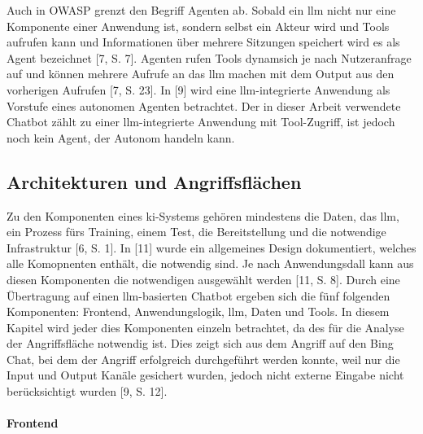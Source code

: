 Auch in OWASP grenzt den Begriff Agenten ab. Sobald ein \ac{llm} nicht nur eine Komponente einer Anwendung ist, sondern selbst ein Akteur wird und Tools aufrufen kann
und Informationen über mehrere Sitzungen speichert wird es als Agent bezeichnet [7, S. 7]. Agenten rufen Tools dynamsich je nach Nutzeranfrage auf und können 
mehrere Aufrufe an das \ac{llm} machen mit dem Output aus den vorherigen Aufrufen [7, S. 23]. In [9] wird eine \ac{llm}-integrierte Anwendung als Vorstufe eines 
autonomen Agenten betrachtet. Der in dieser Arbeit verwendete Chatbot zählt zu einer \ac{llm}-integrierte Anwendung mit Tool-Zugriff, ist jedoch noch kein 
Agent, der Autonom handeln kann. \\

\subsection{Architekturen und Angriffsflächen}

Zu den Komponenten eines \ac{ki}-Systems gehören mindestens die Daten, das \ac{llm}, ein Prozess fürs Training, einem Test, die Bereitstellung und die notwendige 
Infrastruktur [6, S. 1]. In [11] wurde ein allgemeines Design dokumentiert, welches alle Komopnenten enthält, die notwendig sind. Je nach Anwendungsdall kann 
aus diesen Komponenten die notwendigen ausgewählt werden [11, S. 8]. Durch eine Übertragung auf einen \ac{llm}-basierten Chatbot ergeben sich die fünf folgenden 
Komponenten: Frontend, Anwendungslogik, \ac{llm}, Daten und Tools. In diesem Kapitel wird jeder dies Komponenten einzeln betrachtet, da des für die Analyse
der Angriffsfläche notwendig ist. Dies zeigt sich aus dem Angriff auf den Bing Chat, bei dem der Angriff erfolgreich durchgeführt werden konnte, weil nur die 
Input und Output Kanäle gesichert wurden, jedoch nicht externe Eingabe nicht berücksichtigt wurden [9, S. 12]. 


\paragraph{Frontend}

